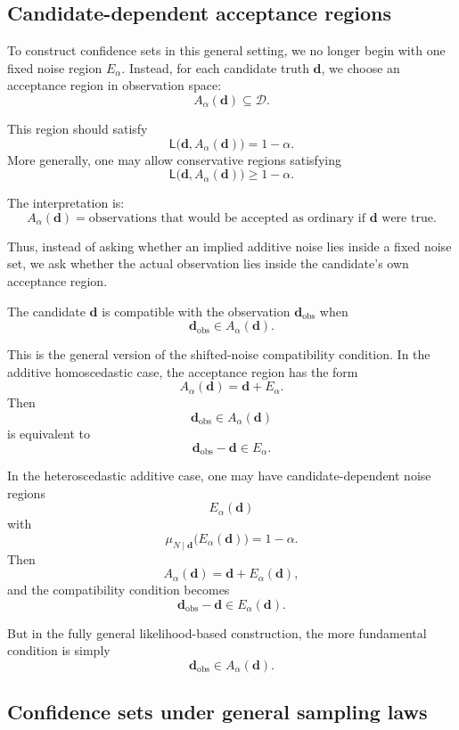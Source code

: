 \documentclass[11pt]{article}
\newcommand{\Dspace}{\mathcal D}
\newcommand{\dobs}{\mathbf d_{\mathrm{obs}}}
\newcommand{\Ealpha}{E_{\alpha}}
\begin{document}
\subsection{Candidate-dependent acceptance regions}

To construct confidence sets in this general setting, we no longer begin with one fixed noise region \(\Ealpha\). Instead, for each candidate truth \(\mathbf d\), we choose an acceptance region in observation space:
\[
    A_{\alpha}(\mathbf d)\subseteq\Dspace.
\]

This region should satisfy
\[
    \mathsf L\bigl(\mathbf d,A_{\alpha}(\mathbf d)\bigr)
    =
    1-\alpha.
\]
More generally, one may allow conservative regions satisfying
\[
    \mathsf L\bigl(\mathbf d,A_{\alpha}(\mathbf d)\bigr)
    \geq
    1-\alpha.
\]

The interpretation is:
\[
    A_{\alpha}(\mathbf d)
    =
    \text{observations that would be accepted as ordinary if } \mathbf d
    \text{ were true.}
\]

Thus, instead of asking whether an implied additive noise lies inside a fixed noise set, we ask whether the actual observation lies inside the candidate's own acceptance region.

The candidate \(\mathbf d\) is compatible with the observation \(\dobs\) when
\[
    \dobs\in A_{\alpha}(\mathbf d).
\]

This is the general version of the shifted-noise compatibility condition. In the additive homoscedastic case, the acceptance region has the form
\[
    A_{\alpha}(\mathbf d)
    =
    \mathbf d+\Ealpha.
\]
Then
\[
    \dobs\in A_{\alpha}(\mathbf d)
\]
is equivalent to
\[
    \dobs-\mathbf d\in\Ealpha.
\]

In the heteroscedastic additive case, one may have candidate-dependent noise regions
\[
    \Ealpha(\mathbf d)
\]
with
\[
    \mu_{N\mid\mathbf d}\bigl(\Ealpha(\mathbf d)\bigr)
    =
    1-\alpha.
\]
Then
\[
    A_{\alpha}(\mathbf d)
    =
    \mathbf d+\Ealpha(\mathbf d),
\]
and the compatibility condition becomes
\[
    \dobs-\mathbf d\in\Ealpha(\mathbf d).
\]

But in the fully general likelihood-based construction, the more fundamental condition is simply
\[
    \dobs\in A_{\alpha}(\mathbf d).
\]

\subsection{Confidence sets under general sampling laws}
\end{document}
